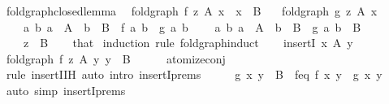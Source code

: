 \begin{isabellebody}
\isanewline
{}\isamarkupfalse%
\ fold{\isacharunderscore}{\kern0pt}graph{\isacharunderscore}{\kern0pt}closed{\isacharunderscore}{\kern0pt}lemma{\isacharcolon}{\kern0pt}\isanewline
\ \ {\isachardoublequoteopen}fold{\isacharunderscore}{\kern0pt}graph\ f\ z\ A\ x\ {\isasymand}\ x\ {\isasymin}\ B{\isachardoublequoteclose}\isanewline
\ \ \ {\isachardoublequoteopen}fold{\isacharunderscore}{\kern0pt}graph\ g\ z\ A\ x{\isachardoublequoteclose}\isanewline
\ \ \ \ {\isachardoublequoteopen}{\isasymAnd}a\ b{\isachardot}{\kern0pt}\ a\ {\isasymin}\ A\ {\isasymLongrightarrow}\ b\ {\isasymin}\ B\ {\isasymLongrightarrow}\ f\ a\ b\ {\isacharequal}{\kern0pt}\ g\ a\ b{\isachardoublequoteclose}\isanewline
\ \ \ \ {\isachardoublequoteopen}{\isasymAnd}a\ b{\isachardot}{\kern0pt}\ a\ {\isasymin}\ A\ {\isasymLongrightarrow}\ b\ {\isasymin}\ B\ {\isasymLongrightarrow}\ g\ a\ b\ {\isasymin}\ B{\isachardoublequoteclose}\isanewline
\ \ \ \ {\isachardoublequoteopen}z\ {\isasymin}\ B{\isachardoublequoteclose}\isanewline
%
\isadelimproof
\ \ %
\endisadelimproof
%
\isatagproof
{}\isamarkupfalse%
\ that{\isacharparenleft}{\kern0pt}{}{\isacharminus}{\kern0pt}{}{\isacharparenright}{\kern0pt}\isanewline
{}\isamarkupfalse%
\ {\isacharparenleft}{\kern0pt}induction\ rule{\isacharcolon}{\kern0pt}\ fold{\isacharunderscore}{\kern0pt}graph{\isachardot}{\kern0pt}induct{\isacharparenright}{\kern0pt}\isanewline
\ \ \isamarkupfalse%
\ {\isacharparenleft}{\kern0pt}insertI\ x\ A\ y{\isacharparenright}{\kern0pt}\isanewline
\ \ \isamarkupfalse%
\ {\isachardoublequoteopen}fold{\isacharunderscore}{\kern0pt}graph\ f\ z\ A\ y{\isachardoublequoteclose}\ {\isachardoublequoteopen}y\ {\isasymin}\ B{\isachardoublequoteclose}\isanewline
\ \ \ \ \isamarkupfalse%
\ atomize{\isacharunderscore}{\kern0pt}conj\isanewline
\ \ \ \ \isamarkupfalse%
\ {\isacharparenleft}{\kern0pt}rule\ insertI{\isachardot}{\kern0pt}IH{\isacharparenright}{\kern0pt}\ {\isacharparenleft}{\kern0pt}auto\ intro{\isacharcolon}{\kern0pt}\ insertI{\isachardot}{\kern0pt}prems{\isacharparenright}{\kern0pt}\isanewline
\ \ \isamarkupfalse%
\ \isamarkupfalse%
\ {\isachardoublequoteopen}g\ x\ y\ {\isasymin}\ B{\isachardoublequoteclose}\ \ f{\isacharunderscore}{\kern0pt}eq{\isacharcolon}{\kern0pt}\ {\isachardoublequoteopen}f\ x\ y\ {\isacharequal}{\kern0pt}\ g\ x\ y{\isachardoublequoteclose}\isanewline
\ \ \ \ \isamarkupfalse%
\ {\isacharparenleft}{\kern0pt}auto\ simp{\isacharcolon}{\kern0pt}\ insertI{\isachardot}{\kern0pt}prems{\isacharparenright}{\kern0pt}\isanewline

\end{isabellebody}
